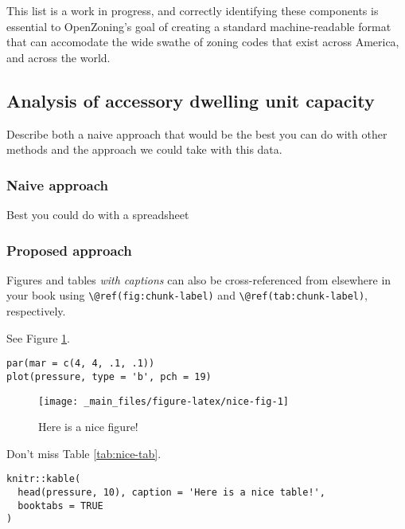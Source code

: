 \documentclass[,]{sagej}
\begin{document}
This list is a work in progress, and correctly identifying these components is essential to OpenZoning's goal of creating a standard machine-readable format that can accomodate the wide swathe of zoning codes that exist across America, and across the world.

\hypertarget{analysis-of-accessory-dwelling-unit-capacity}{%
\subsection{Analysis of accessory dwelling unit capacity}\label{analysis-of-accessory-dwelling-unit-capacity}}

Describe both a naive approach that would be the best you can do with other methods
and the approach we could take with this data.

\hypertarget{naive-approach}{%
\subsubsection{Naive approach}\label{naive-approach}}

Best you could do with a spreadsheet

\hypertarget{proposed-approach}{%
\subsubsection{Proposed approach}\label{proposed-approach}}

Figures and tables \emph{with captions} can also be cross-referenced from elsewhere in your book using \texttt{\textbackslash{}@ref(fig:chunk-label)} and \texttt{\textbackslash{}@ref(tab:chunk-label)}, respectively.

See Figure \ref{fig:nice-fig}.

\begin{verbatim}
par(mar = c(4, 4, .1, .1))
plot(pressure, type = 'b', pch = 19)
\end{verbatim}

\begin{figure}

{\centering \texttt{[image: \_main\_files/figure-latex/nice-fig-1]} 

}

\caption{Here is a nice figure!}\label{fig:nice-fig}
\end{figure}

Don't miss Table \ref{tab:nice-tab}.

\begin{verbatim}
knitr::kable(
  head(pressure, 10), caption = 'Here is a nice table!',
  booktabs = TRUE
)
\end{verbatim}
\end{document}
